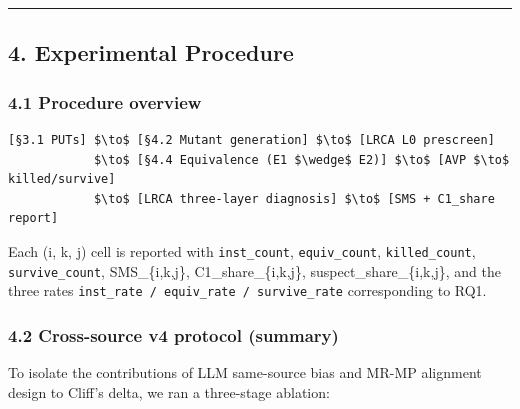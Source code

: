 \documentclass[review,12pt,authoryear]{elsarticle}
\begin{document}
\begin{center}\rule{0.5\linewidth}{0.5pt}\end{center}

\subsection{4. Experimental Procedure}\label{experimental-procedure}

\subsubsection{4.1 Procedure overview}\label{procedure-overview}

\begin{verbatim}
[§3.1 PUTs] $\to$ [§4.2 Mutant generation] $\to$ [LRCA L0 prescreen]
            $\to$ [§4.4 Equivalence (E1 $\wedge$ E2)] $\to$ [AVP $\to$ killed/survive]
            $\to$ [LRCA three-layer diagnosis] $\to$ [SMS + C1_share report]
\end{verbatim}

Each (i, k, j) cell is reported with \texttt{inst\_count},
\texttt{equiv\_count}, \texttt{killed\_count}, \texttt{survive\_count},
SMS\_\{i,k,j\}, C1\_share\_\{i,k,j\}, suspect\_share\_\{i,k,j\}, and the
three rates \texttt{inst\_rate\ /\ equiv\_rate\ /\ survive\_rate}
corresponding to RQ1.

\subsubsection{4.2 Cross-source v4 protocol
(summary)}\label{cross-source-v4-protocol-summary}

To isolate the contributions of LLM same-source bias and MR-MP alignment
design to Cliff's delta, we ran a three-stage ablation:
\end{document}
